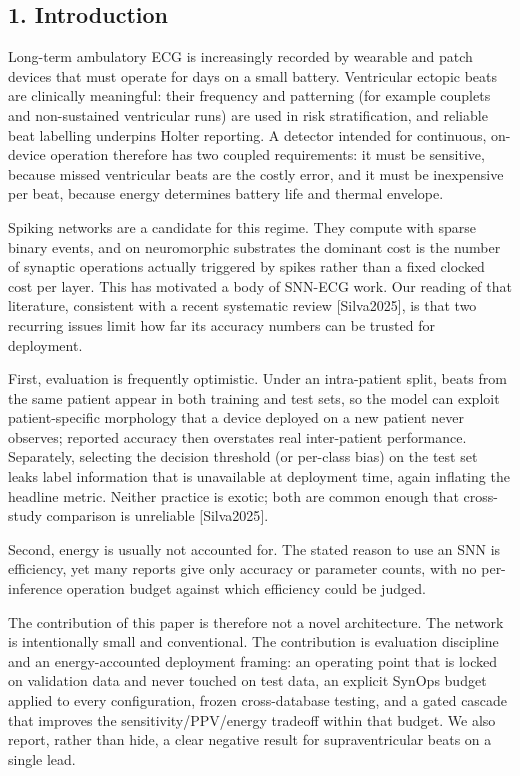 \documentclass[
]{article}
\begin{document}
\subsection{1. Introduction}\label{introduction}

Long-term ambulatory ECG is increasingly recorded by wearable and patch
devices that must operate for days on a small battery. Ventricular
ectopic beats are clinically meaningful: their frequency and patterning
(for example couplets and non-sustained ventricular runs) are used in
risk stratification, and reliable beat labelling underpins Holter
reporting. A detector intended for continuous, on-device operation
therefore has two coupled requirements: it must be sensitive, because
missed ventricular beats are the costly error, and it must be
inexpensive per beat, because energy determines battery life and thermal
envelope.

Spiking networks are a candidate for this regime. They compute with
sparse binary events, and on neuromorphic substrates the dominant cost
is the number of synaptic operations actually triggered by spikes rather
than a fixed clocked cost per layer. This has motivated a body of
SNN-ECG work. Our reading of that literature, consistent with a recent
systematic review {[}Silva2025{]}, is that two recurring issues limit
how far its accuracy numbers can be trusted for deployment.

First, evaluation is frequently optimistic. Under an intra-patient
split, beats from the same patient appear in both training and test
sets, so the model can exploit patient-specific morphology that a device
deployed on a new patient never observes; reported accuracy then
overstates real inter-patient performance. Separately, selecting the
decision threshold (or per-class bias) on the test set leaks label
information that is unavailable at deployment time, again inflating the
headline metric. Neither practice is exotic; both are common enough that
cross-study comparison is unreliable {[}Silva2025{]}.

Second, energy is usually not accounted for. The stated reason to use an
SNN is efficiency, yet many reports give only accuracy or parameter
counts, with no per-inference operation budget against which efficiency
could be judged.

The contribution of this paper is therefore not a novel architecture.
The network is intentionally small and conventional. The contribution is
evaluation discipline and an energy-accounted deployment framing: an
operating point that is locked on validation data and never touched on
test data, an explicit SynOps budget applied to every configuration,
frozen cross-database testing, and a gated cascade that improves the
sensitivity/PPV/energy tradeoff within that budget. We also report,
rather than hide, a clear negative result for supraventricular beats on
a single lead.
\end{document}
